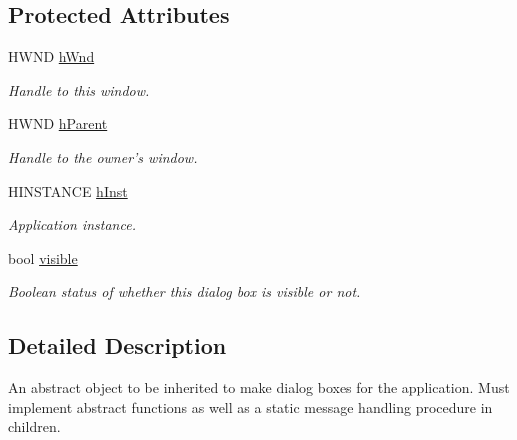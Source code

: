 \subsection*{Protected Attributes}
\begin{DoxyCompactItemize}
\item 
\hypertarget{class_dialog_base_ac59c26088bd7e6baffc587efee8c63d8}{
HWND \hyperlink{class_dialog_base_ac59c26088bd7e6baffc587efee8c63d8}{hWnd}}
\label{class_dialog_base_ac59c26088bd7e6baffc587efee8c63d8}

\begin{DoxyCompactList}\small\item\em Handle to this window. \end{DoxyCompactList}\item 
\hypertarget{class_dialog_base_af79895093345bc9b7fa25c4de611033b}{
HWND \hyperlink{class_dialog_base_af79895093345bc9b7fa25c4de611033b}{hParent}}
\label{class_dialog_base_af79895093345bc9b7fa25c4de611033b}

\begin{DoxyCompactList}\small\item\em Handle to the owner's window. \end{DoxyCompactList}\item 
\hypertarget{class_dialog_base_ab8f922c7d765d366999cfd737740557a}{
HINSTANCE \hyperlink{class_dialog_base_ab8f922c7d765d366999cfd737740557a}{hInst}}
\label{class_dialog_base_ab8f922c7d765d366999cfd737740557a}

\begin{DoxyCompactList}\small\item\em Application instance. \end{DoxyCompactList}\item 
\hypertarget{class_dialog_base_a42e069e716bb04f4a529321a6f9fe0dd}{
bool \hyperlink{class_dialog_base_a42e069e716bb04f4a529321a6f9fe0dd}{visible}}
\label{class_dialog_base_a42e069e716bb04f4a529321a6f9fe0dd}

\begin{DoxyCompactList}\small\item\em Boolean status of whether this dialog box is visible or not. \end{DoxyCompactList}\end{DoxyCompactItemize}


\subsection{Detailed Description}
An abstract object to be inherited to make dialog boxes for the application. Must implement abstract functions as well as a static message handling procedure in children. 

